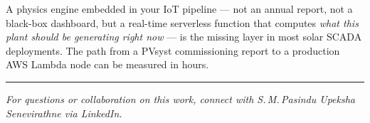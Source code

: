 \documentclass[11pt, a4paper]{article}
\begin{document}
\begin{insightbox}
A physics engine embedded in your IoT pipeline --- not an annual report,
not a black-box dashboard, but a real-time serverless function that computes
\emph{what this plant should be generating right now} --- is the missing
layer in most solar SCADA deployments. The path from a PVsyst commissioning
report to a production AWS Lambda node can be measured in hours.
\end{insightbox}



\vspace{1em}

\noindent\rule{\linewidth}{0.4pt}

{\small\color{lightgrey}
\noindent\textit{For questions or collaboration on this work, connect with
S.\,M.\,Pasindu Upeksha Senevirathne via LinkedIn.}}


\newpage
\printbibliography[title={References}]
\end{document}
